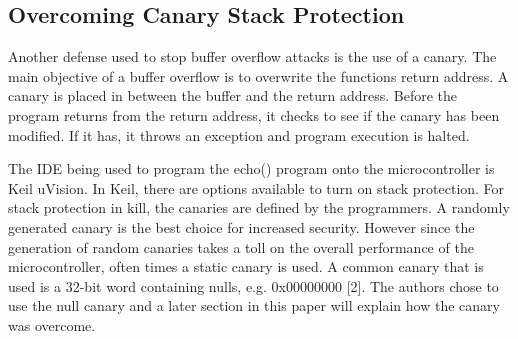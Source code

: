 \documentclass[letterpaper, 10 pt, conference]{ieeeconf}  %
\begin{document}
\subsection{Overcoming Canary Stack Protection}

Another defense used to stop buffer overflow attacks is the use of a canary.  The main objective of a buffer overflow is to overwrite the functions return address.  A canary is placed in between the buffer and the return address.  Before the program returns from the return address, it checks to see if the canary has been modified.  If it has, it throws an exception and program execution is halted.

The IDE being used to program the echo() program onto the microcontroller is Keil uVision.  In Keil, there are options available to turn on stack protection.  For stack protection in kill, the canaries are defined by the programmers.  A randomly generated canary is the best choice for increased security.  However since the generation of random canaries takes a toll on the overall performance of the microcontroller, often times a static canary is used.  A common canary that is used is a 32-bit word containing nulls, e.g. $0$x$00000000$ [2].  The authors chose to use the null canary and a later section in this paper will explain how the canary was overcome. 



\end{document}
